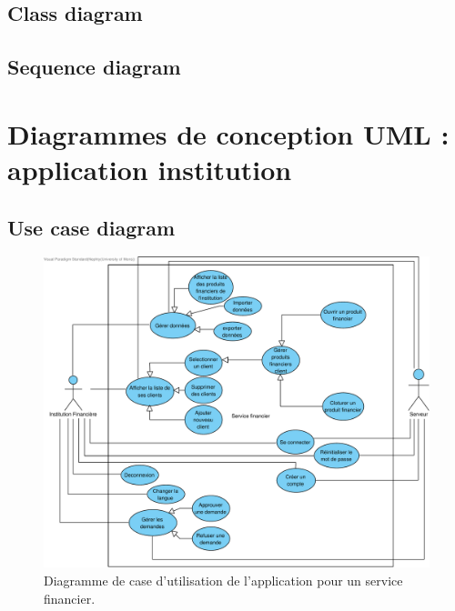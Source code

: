 \documentclass[]{report}
\begin{document}
\newpage


\subsection{Class diagram}



\newpage

\subsection{Sequence diagram}



\newpage



\section{Diagrammes de conception UML : application institution}



\subsection{Use case diagram}



\begin{figure}[h]
	\centering\includegraphics[width=\linewidth]{img/Use Case Institution.pdf}
	\caption{Diagramme de case d'utilisation de l'application pour un service financier.}
\end{figure}
\end{document}
